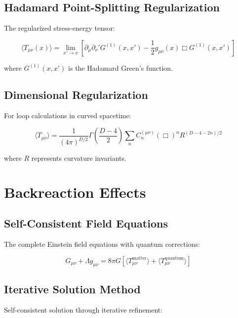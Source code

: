 \documentclass[12pt,a4paper]{article}
\begin{document}
\subsection{Hadamard Point-Splitting Regularization}

The regularized stress-energy tensor:

\begin{equation}
\langle T_{\mu\nu}(x) \rangle = \lim_{x' \to x} \left[ \partial_\mu \partial_\nu' G^{(1)}(x,x') - \frac{1}{2} g_{\mu\nu}(x) \Box G^{(1)}(x,x') \right]
\end{equation}

where $G^{(1)}(x,x')$ is the Hadamard Green's function.

\subsection{Dimensional Regularization}

For loop calculations in curved spacetime:

\begin{equation}
\langle T_{\mu\nu} \rangle = \frac{1}{(4\pi)^{D/2}} \Gamma\left(\frac{D-4}{2}\right) \sum_{n} C_n^{(\mu\nu)} (\Box)^n R^{(D-4-2n)/2}
\end{equation}

where $R$ represents curvature invariants.

\section{Backreaction Effects}

\subsection{Self-Consistent Field Equations}

The complete Einstein field equations with quantum corrections:

\begin{equation}
G_{\mu\nu} + \Lambda g_{\mu\nu} = 8\pi G \left[ \langle T_{\mu\nu}^{\text{matter}} \rangle + \langle T_{\mu\nu}^{\text{quantum}} \rangle \right]
\end{equation}

\subsection{Iterative Solution Method}

Self-consistent solution through iterative refinement:
\end{document}
